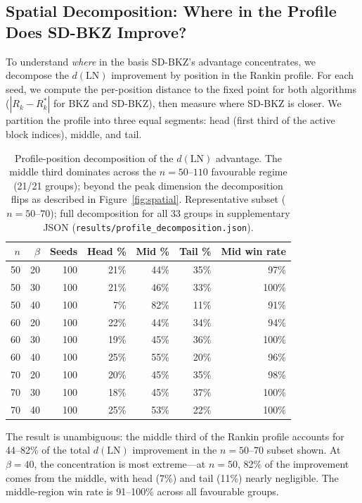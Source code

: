 \documentclass[journal=cic,version=preprint]{iacrj}
\begin{document}
\subsection{Spatial Decomposition: Where in the Profile Does SD-BKZ Improve?}
\label{sec:spatial}

To understand \emph{where} in the basis SD-BKZ's advantage concentrates, we decompose the $d(\mathrm{LN})$ improvement by position in the Rankin profile. For each seed, we compute the per-position distance to the fixed point for both algorithms ($|R_k - R^*_k|$ for BKZ and SD-BKZ), then measure where SD-BKZ is closer. We partition the profile into three equal segments: head (first third of the active block indices), middle, and tail.

\begin{table}[tbp]
\centering
\caption{Profile-position decomposition of the $d(\mathrm{LN})$ advantage. The middle third dominates across the $n=50$--$110$ favourable regime (21/21 groups); beyond the peak dimension the decomposition flips as described in Figure~\ref{fig:spatial}. Representative subset ($n=50$--$70$); full decomposition for all 33 groups in supplementary JSON (\texttt{results/profile\_decomposition.json}).\label{tab:spatial}}
\small
\begin{tabular}{rrrrrrr}
\hline
$n$ & $\beta$ & Seeds & Head \% & Mid \% & Tail \% & Mid win rate \\
\hline
50 & 20 & 100 & 21\% & 44\% & 35\% & 97\% \\
50 & 30 & 100 & 21\% & 46\% & 33\% & 100\% \\
50 & 40 & 100 & 7\%  & 82\% & 11\% & 91\% \\
60 & 20 & 100 & 22\% & 44\% & 34\% & 94\% \\
60 & 30 & 100 & 19\% & 45\% & 36\% & 100\% \\
60 & 40 & 100 & 25\% & 55\% & 20\% & 96\% \\
70 & 20 & 100 & 20\% & 45\% & 35\% & 98\% \\
70 & 30 & 100 & 18\% & 45\% & 37\% & 100\% \\
70 & 40 & 100 & 25\% & 53\% & 22\% & 100\% \\
\hline
\end{tabular}
\end{table}

The result is unambiguous: the middle third of the Rankin profile accounts for 44--82\% of the total $d(\mathrm{LN})$ improvement in the $n=50$--$70$ subset shown. At $\beta=40$, the concentration is most extreme---at $n=50$, 82\% of the improvement comes from the middle, with head (7\%) and tail (11\%) nearly negligible. The middle-region win rate is 91--100\% across all favourable groups.
\end{document}
